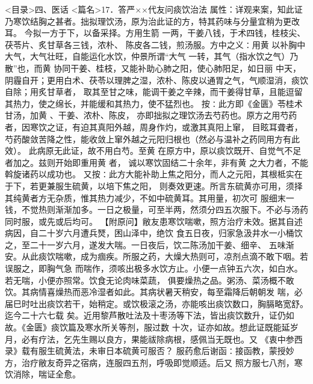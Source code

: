 \documentclass[a4paper,12pt,UTF8,twoside]{ctexbook}
\begin{document}
<目录>四、医话
<篇名>17．答严××代友问痰饮治法
属性：详观来案，知此证乃寒饮结胸之甚者。拙拟理饮汤，原为治此证的方，特其药味与分量宜稍为更改耳。 
今拟一方于下，以备采择。方用生箭 一两，干姜八钱，于术四钱，桂枝尖、茯苓片、炙甘草各三钱，浓朴、 
陈皮各二钱，煎汤服。方中之义∶用黄 以补胸中大气，大气壮旺，自能运化水饮，仲景所谓“大气 
一转，其气（指水饮之气）乃散”也，而黄 协同干姜、桂枝，又能补助心肺之阳，使心肺阳足，如日丽 
中天，阴霾自开；更用白术、茯苓以理脾之湿，浓朴、陈皮以通胃之气，气顺湿消，痰饮自除；用炙甘草者， 
取其至甘之味，能调干姜之辛辣，而干姜得甘草，且能逗留其热力，使之绵长，并能缓和其热力，使不猛烈也。 
按∶此方即《金匮》苓桂术甘汤，加黄 、干姜、浓朴、陈皮， 
亦即拙拟之理饮汤去芍药也。原方之用芍药者，因寒饮之证，有迫其真阳外越，周身作灼，或激其真阳上窜， 
目眩耳聋者，芍药酸敛苦降之性，能收敛上窜外越之元阳归根也（然必与温补之药同用方有此效）。 
此病原无此证，故不用白芍。至黄 在原方中，原以痰饮既开、自觉气不足者加之。兹则开始即重用黄 者， 
诚以寒饮固结二十余年，非有黄 之大力者，不能斡旋诸药以成功也。 
又按∶此方大能补助上焦之阳分，而人之元阳，其根柢实在于下，若更兼服生硫黄，以培下焦之阳， 
则奏效更速。所言东硫黄亦可用，须择其纯黄者方无杂质，惟其热力减少，不如中硫黄耳。其用量，初次可 
服细末一钱，不觉热则渐渐加多。一日之极量，可至半两，然须分四五次服下。不必与汤药同时服，或先或后均可。 
【附原问】敝友患寒饮喘嗽，照方治疗未效。据其自述病因，自二十岁六月遭兵燹，困山泽中，绝饮 
食五日夜，归家急汲井水一小桶饮之，至二十一岁六月，遂发大喘。一日夜后，饮二陈汤加干姜、细辛、 
五味渐安。从此痰饮喘嗽，成为痼疾。所服之药，大燥大热则可，凉剂点滴不敢下咽。若误服之，即胸气急 
而喘作，须咳出极多水饮方止。小便一点钟五六次，如白水。若无喘，小便亦照常。饮食无论肉味菜蔬， 
俱要燥热之品。粥汤、菜汤概不敢饮。其病情喜燥热而恶冷湿者如此。其病状暑天稍安，每至霜降后朝朝发 
喘，必届巳时吐出痰饮若干，始稍定。或饮极滚之汤，亦能咳出痰饮数口，胸膈略宽舒。迄今二十六七载 
矣。近用黎芦散吐法及十枣汤等下法，皆出痰饮数升，证仍如故。《金匮》痰饮篇及寒水所关等剂，服过数 
十次，证亦如故。想此证既能延岁月，必有疗法，乞先生赐以良方，果能祓除病根，感佩当无既也。又 
《衷中参西录》载有服生硫黄法，未审日本硫黄可服否？ 
服药愈后谢函∶接函教，蒙授妙方，治疗敝友奇异之宿病，连服四五剂，呼吸即觉顺适。后又 
照方服七八剂，寒饮消除，喘证全愈。 
\end{document}
